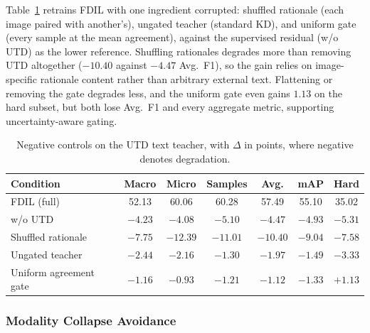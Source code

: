 Table~\ref{tab:negative_controls} retrains FDIL with one ingredient corrupted: shuffled rationale (each image paired with another's), ungated teacher (standard KD), and uniform gate (every sample at the mean agreement), against the supervised residual (w/o UTD) as the lower reference. Shuffling rationales degrades more than removing UTD altogether ($-10.40$ against $-4.47$ Avg.\ F1), so the gain relies on image-specific rationale content rather than arbitrary external text. Flattening or removing the gate degrades less, and the uniform gate even gains $1.13$ on the hard subset, but both lose Avg.\ F1 and every aggregate metric, supporting uncertainty-aware gating.

\begin{table}[htbp]
\centering
\small
\caption{Negative controls on the UTD text teacher, with $\Delta$ in points, where negative denotes degradation.}
\label{tab:negative_controls}
\setlength{\tabcolsep}{4pt}
\begin{tabular}{lcccccc}
\hline
Condition & Macro & Micro & Samples & Avg. & mAP & Hard \\
\hline
FDIL (full) & 52.13 & 60.06 & 60.28 & 57.49 & 55.10 & 35.02 \\
\quad w/o UTD & $-4.23$ & $-4.08$ & $-5.10$ & $-4.47$ & $-4.93$ & $-5.31$ \\
\quad Shuffled rationale & $-7.75$ & $-12.39$ & $-11.01$ & $-10.40$ & $-9.04$ & $-7.58$ \\
\quad Ungated teacher & $-2.44$ & $-2.16$ & $-1.30$ & $-1.97$ & $-1.49$ & $-3.33$ \\
\quad Uniform agreement gate & $-1.16$ & $-0.93$ & $-1.21$ & $-1.12$ & $-1.33$ & $+1.13$ \\
\hline
\end{tabular}
\end{table}

\iffalse
\subsubsection{Modality Collapse Avoidance}

